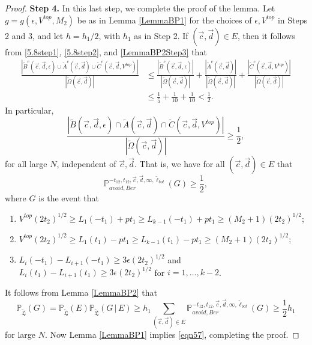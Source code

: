 \begin{proof}
	{\bf \raggedleft Step 4.} In this last step, we complete the proof of the lemma. Let $g=g(\epsilon,V^{top},M_2)$ be as in Lemma \ref{LemmaBP1} for the choices of $\epsilon,V^{top}$ in Steps 2 and 3, and let $h = h_1/2$, with $h_1$ as in Step 2. If $(\vec{c},\vec{d})\in E$, then it follows from \eqref{5.8step1}, \eqref{5.8step2}, and \eqref{LemmaBP2Step3} that
	\begin{align*}
	\frac{|\tilde{B}^c(\vec{c}, \vec{d}, \epsilon) \cup \tilde{A}^c(\vec{c}, \vec{d}) \cup \tilde{C}^c(\vec{c}, \vec{d}, V^{top}) |}{|\tilde{\Omega}(\vec{c}, \vec{d})|} &\leq \frac{|\tilde{B}^c(\vec{c}, \vec{d}, \epsilon)|}{|\tilde{\Omega}(\vec{c}, \vec{d})|} + \frac{| \tilde{A}^c(\vec{c}, \vec{d}) |}{|\tilde{\Omega}(\vec{c}, \vec{d})|} + \frac{|\tilde{C}^c(\vec{c}, \vec{d}, V^{top}) |}{|\tilde{\Omega}(\vec{c}, \vec{d})|}\\
	&\leq \frac{1}{5} + \frac{1}{10} + \frac{1}{10} < \frac{1}{2}.
	\end{align*}
	In particular,
	\begin{equation}
	\frac{|\tilde{B}(\vec{c}, \vec{d}, \epsilon) \cap \tilde{A}(\vec{c}, \vec{d}) \cap \tilde{C}(\vec{c}, \vec{d}, V^{top}) |}{|\tilde{\Omega}(\vec{c}, \vec{d})|} \geq  \frac{1}{2},
	\end{equation}
	for all large $N$, independent of $\vec{c},\vec{d}$. That is, we have for all $(\vec{c}, \vec{d}) \in E$ that
	$$\mathbb{P}_{avoid, Ber}^{-t_{12}, t_{12}, \vec{c}, \vec{d}, \infty, \tilde{\ell}_{bot}} ( G) \geq \frac{1}{2},$$
	where $G$ is the event that
	
	\begin{enumerate}
		\item $V^{top} (2t_2)^{1/2} \geq L_1(-t_1) + p t_1 \geq L_{k-1}(-t_1) + pt_1 \geq (M_2 + 1) (2t_2)^{1/2}$;
		\item $V^{top} (2t_2)^{1/2} \geq L_1(t_1) - p t_1 \geq L_{k-1}(t_1) - pt_1 \geq (M_2 + 1) (2t_2)^{1/2}$; 
		\item $L_i(-t_1) -L_{i+1}(-t_1) \geq 3\epsilon (2t_2)^{1/2}$ and $L_i(t_1) -L_{i+1}(t_1)  \geq 3 \epsilon (2t_2)^{1/2}$ for $i = 1, \dots, k-2$.
	\end{enumerate}
	It follows from Lemma \ref{LemmaBP2} that
	\[
	\mathbb{P}_{\tilde{\mathfrak{L}}}(G) = \mathbb{P}_{\tilde{\mathfrak{L}}}(E) \mathbb{P}_{\tilde{\mathfrak{L}}}(G\,|\,E) \geq h_1 \sum_{(\vec{c},\vec{d})\in E} \mathbb{P}_{avoid, Ber}^{-t_{12}, t_{12}, \vec{c}, \vec{d}, \infty, \tilde{\ell}_{bot}} ( G ) \geq \frac{1}{2}h_1
	\]
	for large $N$. Now Lemma \ref{LemmaBP1} implies \eqref{eqn57}, completing the proof.
\end{proof}